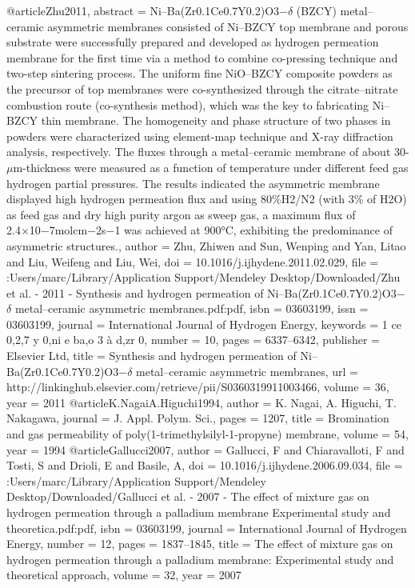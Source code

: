@article{Zhu2011,
abstract = {Ni–Ba(Zr0.1Ce0.7Y0.2)O3−$\delta$ (BZCY) metal–ceramic asymmetric membranes consisted of Ni–BZCY top membrane and porous substrate were successfully prepared and developed as hydrogen permeation membrane for the first time via a method to combine co-pressing technique and two-step sintering process. The uniform fine NiO–BZCY composite powders as the precursor of top membranes were co-synthesized through the citrate–nitrate combustion route (co-synthesis method), which was the key to fabricating Ni–BZCY thin membrane. The homogeneity and phase structure of two phases in powders were characterized using element-map technique and X-ray diffraction analysis, respectively. The fluxes through a metal–ceramic membrane of about 30-$\mu$m-thickness were measured as a function of temperature under different feed gas hydrogen partial pressures. The results indicated the asymmetric membrane displayed high hydrogen permeation flux and using 80{\%}H2/N2 (with 3{\%} of H2O) as feed gas and dry high purity argon as sweep gas, a maximum flux of 2.4×10−7molcm−2s−1 was achieved at 900°C, exhibiting the predominance of asymmetric structures.},
author = {Zhu, Zhiwen and Sun, Wenping and Yan, Litao and Liu, Weifeng and Liu, Wei},
doi = {10.1016/j.ijhydene.2011.02.029},
file = {:Users/marc/Library/Application Support/Mendeley Desktop/Downloaded/Zhu et al. - 2011 - Synthesis and hydrogen permeation of Ni–Ba(Zr0.1Ce0.7Y0.2)O3−$\delta$ metal–ceramic asymmetric membranes.pdf:pdf},
isbn = {03603199},
issn = {03603199},
journal = {International Journal of Hydrogen Energy},
keywords = {1 ce 0,2,7 y 0,ni e ba,o 3 {\`{a}} d,zr 0},
number = {10},
pages = {6337--6342},
publisher = {Elsevier Ltd},
title = {{Synthesis and hydrogen permeation of Ni–Ba(Zr0.1Ce0.7Y0.2)O3−$\delta$ metal–ceramic asymmetric membranes}},
url = {http://linkinghub.elsevier.com/retrieve/pii/S0360319911003466},
volume = {36},
year = {2011}
}
@article{K.NagaiA.Higuchi1994,
author = {{K. Nagai, A. Higuchi}, T. Nakagawa},
journal = {J. Appl. Polym. Sci.},
pages = {1207},
title = {{Bromination and gas permeability of poly(1-trimethylsilyl-1-propyne) membrane}},
volume = {54},
year = {1994}
}
@article{Gallucci2007,
author = {Gallucci, F and Chiaravalloti, F and Tosti, S and Drioli, E and Basile, A},
doi = {10.1016/j.ijhydene.2006.09.034},
file = {:Users/marc/Library/Application Support/Mendeley Desktop/Downloaded/Gallucci et al. - 2007 - The effect of mixture gas on hydrogen permeation through a palladium membrane Experimental study and theoretica.pdf:pdf},
isbn = {03603199},
journal = {International Journal of Hydrogen Energy},
number = {12},
pages = {1837--1845},
title = {{The effect of mixture gas on hydrogen permeation through a palladium membrane: Experimental study and theoretical approach}},
volume = {32},
year = {2007}
}
